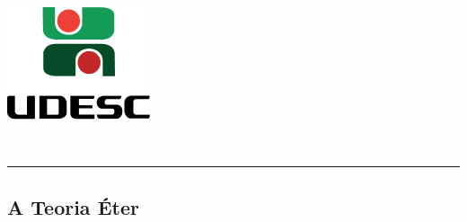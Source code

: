 \thispagestyle{empty}
\begin{center}
	\begin{minipage}[!]{\linewidth}
        \begin{minipage}[!]{.19\linewidth}
            \includegraphics[width=\linewidth]{img/logo.png}           
        \end{minipage}
        \begin{minipage}[!]{.8\linewidth}
            \center
            \ABNTEXchapterfont\normalsize\MakeUppercase{\imprimirinstituicao}
            \par
            \vspace*{10pt}                     
            \ABNTEXchapterfont\normalsize\MakeUppercase{\centro}
            \par
            \vspace*{10pt}           
            \ABNTEXchapterfont\normalsize\MakeUppercase{\disciplina}
        \end{minipage}        
    \end{minipage}
    \\ \vspace{0.5cm}
    \rule{\textwidth}{.5pt}   
\end{center}
    \textual
    \begin{center}
      \section{A Teoria Éter}
      \par
    \end{center}
    
